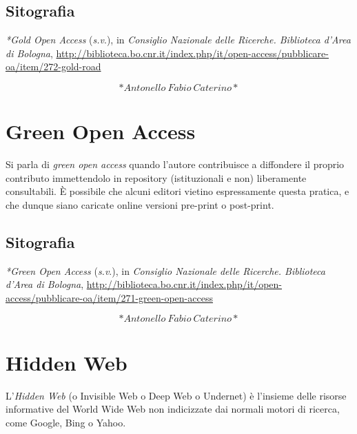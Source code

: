 \documentclass[
  b5paper,
  twoside,
  12pt,
  chapterprefix=false,
  bibliography=totocnumbered,
  parskip=false]{scrbook}
\begin{document}
\hypertarget{sitografia-15}{%
\section*{Sitografia}\label{sitografia-15}}

\emph{*Gold Open Access} (\emph{s.v}.), in \emph{Consiglio Nazionale delle Ricerche.
Biblioteca d'Area di Bologna},
\url{http://biblioteca.bo.cnr.it/index.php/it/open-access/pubblicare-oa/item/272-gold-road}

\[*Antonello~Fabio~Caterino*\]

\hypertarget{green-open-access}{%
\chapter{Green Open Access}\label{green-open-access}}

Si parla di \emph{green open access} quando l'autore contribuisce a
diffondere il proprio contributo immettendolo in repository
(istituzionali e non) liberamente consultabili. È possibile che alcuni
editori vietino espressamente questa pratica, e che dunque siano
caricate online versioni pre-print o post-print.

\hypertarget{sitografia-16}{%
\section*{Sitografia}\label{sitografia-16}}

\emph{*Green Open Access} (\emph{s.v}.), in \emph{Consiglio Nazionale delle Ricerche.
Biblioteca d'Area di Bologna},
\url{http://biblioteca.bo.cnr.it/index.php/it/open-access/pubblicare-oa/item/271-green-open-access}

\[*Antonello~Fabio~Caterino*\]

\hypertarget{hidden-web}{%
\chapter{Hidden Web}\label{hidden-web}}

L'\emph{Hidden Web} (o Invisible Web o Deep Web o Undernet) è l'insieme delle
risorse informative del World Wide Web non indicizzate dai normali
motori di ricerca, come Google, Bing o Yahoo.
\end{document}
